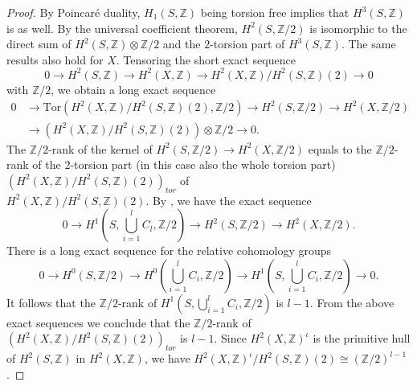 \documentclass[12pt,reqno,a4paper]{amsart}
\theoremstyle{remark}
\theoremstyle{definition}
\begin{document}
\begin{proof}
    By Poincar\'e duality, $H_1(S,\mathbb{Z})$ being torsion free implies that $H^3(S,\mathbb{Z})$ is as well. 
    By the universal coefficient theorem, $H^2(S,\mathbb{Z}/2)$ is isomorphic to the direct sum of $H^2(S,\mathbb{Z})\otimes\mathbb{Z}/2$ and the $2$-torsion part of $H^3(S,\mathbb{Z})$. 
    The same results also hold for $X$.
    Tensoring the short exact sequence 
    \begin{equation*}
        0\to H^2(S,\mathbb{Z})\to H^2(X,\mathbb{Z})\to H^2(X,\mathbb{Z})/H^2(S,\mathbb{Z})(2)\to 0
    \end{equation*}
    with $\mathbb{Z}/2$, we obtain a long exact sequence 
    \begin{align*}
        0 & \to \mathrm{Tor}(H^2(X,\mathbb{Z})/H^2(S,\mathbb{Z})(2),\mathbb{Z}/2)\to H^2(S,\mathbb{Z}/2)\to H^2(X,\mathbb{Z}/2) \\
        & \to (H^2(X,\mathbb{Z})/H^2(S,\mathbb{Z})(2))\otimes \mathbb{Z}/2\to 0.
    \end{align*}
    The $\mathbb{Z}/2$-rank of the kernel of $H^2(S,\mathbb{Z}/2)\to H^2(X,\mathbb{Z}/2)$ equals to the $\mathbb{Z}/2$-rank of the $2$-torsion part (in this case also the whole torsion part) $(H^2(X,\mathbb{Z})/H^2(S,\mathbb{Z})(2))_{tor}$ of \\$H^2(X,\mathbb{Z})/H^2(S,\mathbb{Z})(2)$.
    By \cite[Theorem 1]{lee1995homology}, we have the exact sequence 
    \begin{equation*}
        0\to H^1(S,\bigcup_{i=1}^{l}C_l,\mathbb{Z}/2)\to H^2(S,\mathbb{Z}/2)\to H^2(X,\mathbb{Z}/2).
    \end{equation*}
    There is a long exact sequence for the relative cohomology groups
    \begin{equation*}
        0\to H^0(S,\mathbb{Z}/2)\to H^0(\bigcup_{i=1}^{l}C_i,\mathbb{Z}/2)\to H^1(S,\bigcup_{i=1}^l C_i,\mathbb{Z}/2)\to 0.
    \end{equation*}
    It follows that the $\mathbb{Z}/2$-rank of $H^1(S,\bigcup_{i=1}^l C_i,\mathbb{Z}/2)$ is $l-1$.
    From the above exact sequences we conclude that the $\mathbb{Z}/2$-rank of $(H^2(X,\mathbb{Z})/H^2(S,\mathbb{Z})(2))_{tor}$ is $l-1$.
    Since $H^2(X,\mathbb{Z})^{\iota}$ is the primitive hull of $H^2(S,\mathbb{Z})$ in $H^2(X,\mathbb{Z})$, we have $H^2(X,\mathbb{Z})^{\iota}/H^2(S,\mathbb{Z})(2)\cong (\mathbb{Z}/2)^{l-1}$.
\end{proof}
\end{document}
